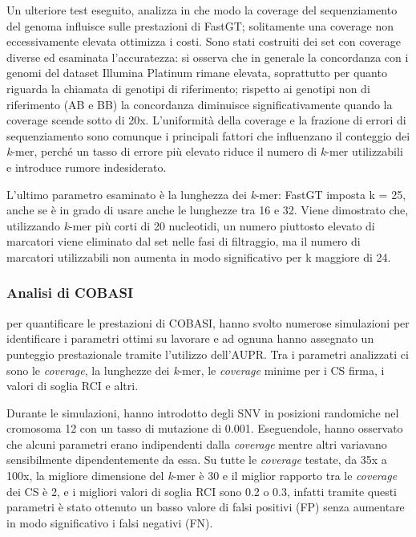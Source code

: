 \documentclass[../main.tex]{subfiles}
\begin{document}
Un ulteriore test eseguito, analizza in che modo la coverage del sequenziamento del genoma influisce sulle prestazioni di FastGT; solitamente una coverage non eccessivamente elevata ottimizza i costi. Sono stati costruiti dei set con coverage diverse ed esaminata l'accuratezza: si osserva che in generale la concordanza con i genomi del dataset Illumina Platinum rimane elevata, soprattutto per quanto riguarda la chiamata di genotipi di riferimento; rispetto ai genotipi non di riferimento (AB e BB) la concordanza diminuisce significativamente quando la coverage scende sotto di 20x. L'uniformità della coverage e la frazione di errori di sequenziamento sono comunque i principali fattori che influenzano il conteggio dei \textit{k}-mer, perché un tasso di errore più elevato riduce il numero di \textit{k}-mer utilizzabili e introduce rumore indesiderato. 

L'ultimo parametro esaminato è la lunghezza dei \textit{k}-mer: FastGT imposta k = 25, anche se è in grado di usare anche le lunghezze tra 16 e 32. Viene dimostrato che, utilizzando \textit{k}-mer più corti di 20 nucleotidi, un numero piuttosto elevato di marcatori viene eliminato dal set nelle fasi di filtraggio, ma il numero di marcatori utilizzabili non aumenta in modo significativo per k maggiore di 24.

\subsubsection{Analisi di COBASI}

\cite{gomez-romero2018cobasi} per quantificare le prestazioni di COBASI, hanno svolto numerose simulazioni per identificare i parametri ottimi su lavorare e ad ognuna hanno assegnato un punteggio prestazionale tramite l'utilizzo dell'AUPR. Tra i parametri analizzati ci sono le \textit{coverage}, la lunghezze dei \textit{k}-mer, le \textit{coverage} minime per i CS firma, i valori di soglia RCI e altri.

Durante le simulazioni, \cite{gomez-romero2018cobasi} hanno introdotto degli SNV in posizioni randomiche nel cromosoma 12 con un tasso di mutazione di 0.001. Eseguendole, hanno osservato che alcuni parametri erano indipendenti dalla \textit{coverage} mentre altri variavano sensibilmente dipendentemente da essa. Su tutte le \textit{coverage} testate, da 35x a 100x, la migliore dimensione del \textit{k}-mer è 30 e il miglior rapporto tra le \textit{coverage} dei CS è 2, e i migliori valori di soglia RCI sono 0.2 o 0.3, infatti tramite questi parametri è stato ottenuto un basso valore di falsi positivi (FP) senza aumentare in modo significativo i falsi negativi (FN). 
\end{document}
